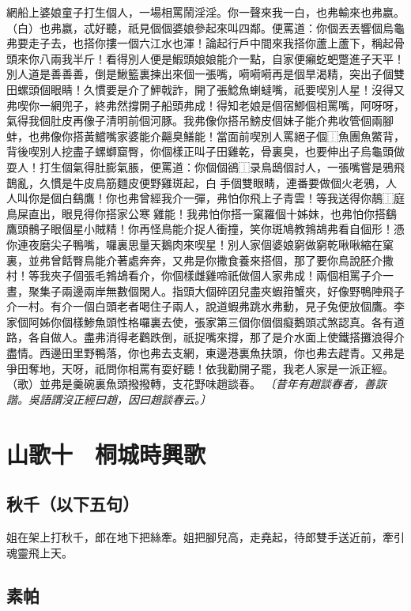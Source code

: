 網船上婆娘童子打生個人，一場相罵鬧淫淫。你一聲來我一白，也弗輸來也弗嬴。（白）也弗嬴，忒好聽，祇見個個婆娘參起來叫四鄰。便罵道：你個丟丟響個烏龜弗要走子去，也搭你摟一個六江水也渾！論起行戶中間來我搭你蘆上蘆下，稱起骨頭來你八兩我半斤！看得別人便是鰕頭娘娘能介一點，自家便癩虼蚆蹩進子天平！別人道是善善善，倒是鰍籃裏揀出來個一張嘴，嗬嗬嗬再是個旱渴精，突出子個雙田螺頭個眼睛！久慣要是介了魻戟詐，開了張鯰魚蝲蟽嘴，祇要喫別人星！沒得又弗喫你一網兜子，終弗然撐開子船頭弗成！得知老娘是個宿鯽個相罵嘴，阿呀呀，氣得我個肚皮再像子清明前個河豚。我弗像你搭吊鰟皮個妹子能介弗收管個兩腳蚌，也弗像你搭黃鱨嘴家婆能介齆臭鱔能！當面前喫別人罵絕子個⿰魚團魚鱉背，背後喫別人挖盡子螺螄窟臀，你個樣正叫子田雞乾，骨裏臭，也要伸出子烏龜頭做耍人！打生個氣得肚膨氣脹，便罵道：你個個鵒⿰录鳥鴟個討人，一張嘴嘗是鴉飛鵲亂，久慣是牛皮鳥筋麵皮便野雞斑起，白𪅃手個雙眼睛，連番要做個火老鴉，人人叫你是個白鷂鷹！你也弗曾經我介一彈，弗怕你飛上子青雲！等我送得你鶄⿰庭鳥屎直出，眼見得你搭家公寒𪅂雞能！我弗怕你搭一窠羅個十姊妹，也弗怕你搭鷂鷹頭鶻子眼個星小賊精！你再怪鳥能介捉人衝撞，笑你斑鳩教鵓鴣弗看自個形！憑你連夜磨尖子鴨嘴，囉裏思量天鵝肉來喫星！別人家個婆娘窮做窮乾啾啾縮在窠裏，並弗曾餂臀鳥能介著處奔奔，又弗是你撒食養來搭個，那了要你鳥說胚介撒村！等我夾子個張毛鵓鴣看介，你個樣雌雞啼祇做個人家弗成！兩個相罵子介一晝，聚集子兩邊兩岸無數個閑人。指頭大個碎囝兒盡夾蝦箝蟹夾，好像野鴨陣飛子介一村。有介一個白頭老者喝住子兩人，說道蝦弗跳水弗動，見子兔便放個鷹。李家個阿姊你個樣鯵魚頭性格囉裏去使，張家第三個你個個癡鵝頭忒煞認真。各有道路，各自做人。盡弗消得老鸛跌倒，祇捉嘴來撐，那了是介水面上使鐵搭攤浪得介盡情。西邊田里野鴨落，你也弗去支網，東邊港裏魚扶頭，你也弗去趕青。又弗是爭田奪地，天呀，祇問你相罵有耍好聽！依我勸開子罷，我老人家是一派正經。（歌）並弗是羹碗裏魚頭撥撥轉，支花野味趙談春。
\textit{〔昔年有趙談春者，善詼諧。吳語謂沒正經曰趙，因曰趙談春云。〕}


\section*{山歌十　桐城時興歌}
\subsection*{秋千（以下五句）}

姐在架上打秋千，郎在地下把絲牽。姐把腳兒高，走堯起，待郎雙手送近前，牽引魂靈飛上天。

\subsection*{素帕}

